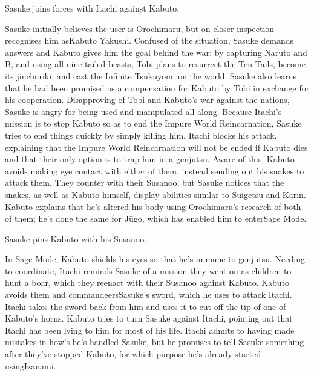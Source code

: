 \documentclass[a4paper,12pt]{article}
\begin{document}
Sasuke joins forces with Itachi against Kabuto.\\ \par \vspace{0.5cm}

Sasuke initially believes the user is Orochimaru, but on closer inspection recognises him asKabuto Yakushi. Confused of the situation, Sasuke demands answers and Kabuto gives him the goal behind the war: by capturing Naruto and B, and using all nine tailed beasts, Tobi plans to resurrect the Ten-Tails, become its jinchūriki, and cast the Infinite Tsukuyomi on the world. Sasuke also learns that he had been promised as a compensation for Kabuto by Tobi in exchange for his cooperation. Disapproving of Tobi and Kabuto's war against the nations, Sasuke is angry for being used and manipulated all along. Because Itachi's mission is to stop Kabuto so as to end the Impure World Reincarnation, Sasuke tries to end things quickly by simply killing him. Itachi blocks his attack, explaining that the Impure World Reincarnation will not be ended if Kabuto dies and that their only option is to trap him in a genjutsu. Aware of this, Kabuto avoids making eye contact with either of them, instead sending out his snakes to attack them. They counter with their Susanoo, but Sasuke notices that the snakes, as well as Kabuto himself, display abilities similar to Suigetsu and Karin. Kabuto explains that he's altered his body using Orochimaru's research of both of them; he's done the same for Jūgo, which has enabled him to enterSage Mode.\\ \par \vspace{0.5cm}

Sasuke pins Kabuto with his Susanoo.\\ \par \vspace{0.5cm}

In Sage Mode, Kabuto shields his eyes so that he's immune to genjutsu. Needing to coordinate, Itachi reminds Sasuke of a mission they went on as children to hunt a boar, which they reenact with their Susanoo against Kabuto. Kabuto avoids them and commandeersSasuke's sword, which he uses to attack Itachi. Itachi takes the sword back from him and uses it to cut off the tip of one of Kabuto's horns. Kabuto tries to turn Sasuke against Itachi, pointing out that Itachi has been lying to him for most of his life. Itachi admits to having made mistakes in how's he's handled Sasuke, but he promises to tell Sasuke something after they've stopped Kabuto, for which purpose he's already started usingIzanami.\\ \par \vspace{0.5cm}
\end{document}
